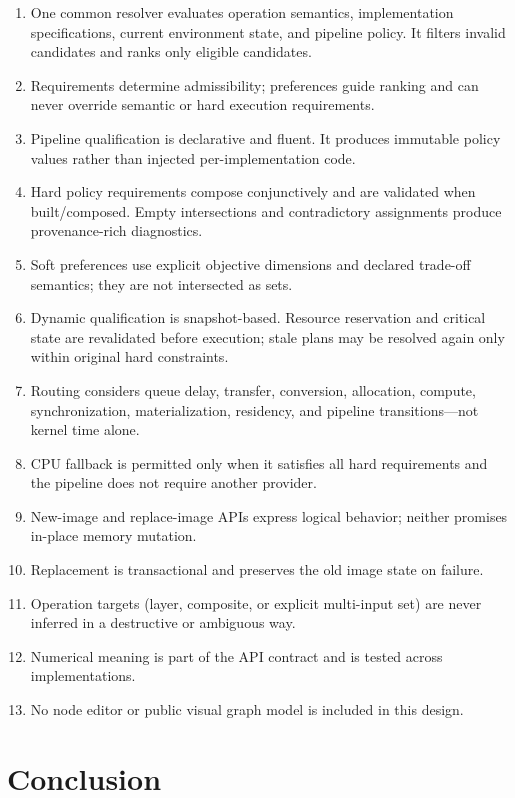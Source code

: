 \documentclass[11pt,a4paper,oneside]{article}
\begin{document}
\begin{enumerate}
  \item One common resolver evaluates operation semantics, implementation specifications, current environment state, and pipeline policy. It filters invalid candidates and ranks only eligible candidates.
  \item Requirements determine admissibility; preferences guide ranking and can never override semantic or hard execution requirements.
  \item Pipeline qualification is declarative and fluent. It produces immutable policy values rather than injected per-implementation code.
  \item Hard policy requirements compose conjunctively and are validated when built/composed. Empty intersections and contradictory assignments produce provenance-rich diagnostics.
  \item Soft preferences use explicit objective dimensions and declared trade-off semantics; they are not intersected as sets.
  \item Dynamic qualification is snapshot-based. Resource reservation and critical state are revalidated before execution; stale plans may be resolved again only within original hard constraints.
  \item Routing considers queue delay, transfer, conversion, allocation, compute, synchronization, materialization, residency, and pipeline transitions—not kernel time alone.
  \item CPU fallback is permitted only when it satisfies all hard requirements and the pipeline does not require another provider.
  \item New-image and replace-image APIs express logical behavior; neither promises in-place memory mutation.
  \item Replacement is transactional and preserves the old image state on failure.
  \item Operation targets (layer, composite, or explicit multi-input set) are never inferred in a destructive or ambiguous way.
  \item Numerical meaning is part of the API contract and is tested across implementations.
  \item No node editor or public visual graph model is included in this design.
\end{enumerate}

\section{Conclusion}
\end{document}
